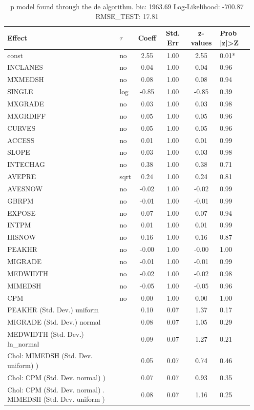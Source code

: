 \begin{table}
	\caption{p model found through the de algorithm. bic: 1963.69 Log-Likelihood: -700.87 RMSE_TEST: 17.81}
	\begin{center}
		\begin{tabular}{|l|l|c|c|c|l|}
			\hline
			Effect & $\tau$ & Coeff & Std. Err & z-values & Prob |z|>Z \\
			\hline
			const & no & 2.55 & 1.00 & 2.55 & 0.01* \\
			\hline
			INCLANES & no & 0.04 & 1.00 & 0.04 & 0.96 \\
			\hline
			MXMEDSH & no & 0.08 & 1.00 & 0.08 & 0.94 \\
			\hline
			SINGLE & log & -0.85 & 1.00 & -0.85 & 0.39 \\
			\hline
			MXGRADE & no & 0.03 & 1.00 & 0.03 & 0.98 \\
			\hline
			MXGRDIFF & no & 0.05 & 1.00 & 0.05 & 0.96 \\
			\hline
			CURVES & no & 0.05 & 1.00 & 0.05 & 0.96 \\
			\hline
			ACCESS & no & 0.01 & 1.00 & 0.01 & 0.99 \\
			\hline
			SLOPE & no & 0.03 & 1.00 & 0.03 & 0.98 \\
			\hline
			INTECHAG & no & 0.38 & 1.00 & 0.38 & 0.71 \\
			\hline
			AVEPRE & sqrt & 0.24 & 1.00 & 0.24 & 0.81 \\
			\hline
			AVESNOW & no & -0.02 & 1.00 & -0.02 & 0.99 \\
			\hline
			GBRPM & no & -0.01 & 1.00 & -0.01 & 0.99 \\
			\hline
			EXPOSE & no & 0.07 & 1.00 & 0.07 & 0.94 \\
			\hline
			INTPM & no & 0.01 & 1.00 & 0.01 & 0.99 \\
			\hline
			HISNOW & no & 0.16 & 1.00 & 0.16 & 0.87 \\
			\hline
			PEAKHR & no & -0.00 & 1.00 & -0.00 & 1.00 \\
			\hline
			MIGRADE & no & -0.01 & 1.00 & -0.01 & 0.99 \\
			\hline
			MEDWIDTH & no & -0.02 & 1.00 & -0.02 & 0.98 \\
			\hline
			MIMEDSH & no & -0.05 & 1.00 & -0.05 & 0.96 \\
			\hline
			CPM & no & 0.00 & 1.00 & 0.00 & 1.00 \\
			\hline
			PEAKHR (Std. Dev.) uniform &  & 0.10 & 0.07 & 1.37 & 0.17 \\
			\hline
			MIGRADE (Std. Dev.) normal &  & 0.08 & 0.07 & 1.05 & 0.29 \\
			\hline
			MEDWIDTH (Std. Dev.) ln_normal &  & 0.09 & 0.07 & 1.27 & 0.21 \\
			\hline
			 Chol: MIMEDSH (Std. Dev. uniform) ) &  & 0.05 & 0.07 & 0.74 & 0.46 \\
			\hline
			 Chol: CPM (Std. Dev. normal) ) &  & 0.07 & 0.07 & 0.93 & 0.35 \\
			\hline
			 Chol: CPM (Std. Dev. normal) . MIMEDSH (Std. Dev.   uniform ) &  & 0.08 & 0.07 & 1.16 & 0.25 \\
			\hline
		\end{tabular}
	\end{center}
\end{table}